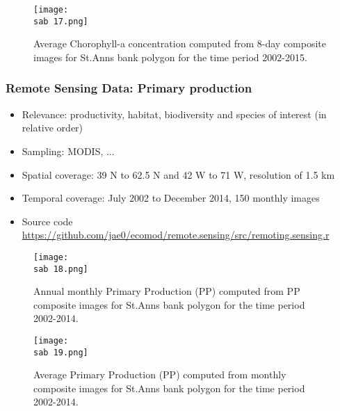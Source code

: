 \documentclass{beamer}
\numberwithin{equation}{section}		%
\numberwithin{figure}{section}		%
\numberwithin{table}{section}				%
\newcommand{\ecomod}{\string~/ecomod_data/}   %
\newcommand{\sab}{\ecomod/mpa/sab/}   %
\begin{document}

\begin{frame}[shrink]
  \begin{figure}[h]
    \centering
    \texttt{[image: \\sab 17.png]}
    \caption {Average Chorophyll-a concentration computed from 8-day composite images for St.Anns bank polygon for the time period 2002-2015. }
    \label{fig:ChlaSeasonal}
  \end{figure}
\end{frame}



\begin{frame}
  \frametitle{Remote Sensing Data: Primary production}
  \begin{itemize}
    \item Relevance:  productivity, habitat, biodiversity and species of interest (in relative order)
    \item Sampling:  MODIS, ...
    \item Spatial coverage: 39 N to 62.5 N and 42 W to 71 W, resolution of 1.5 km
    \item Temporal coverage: July 2002 to December 2014, 150 monthly  images
    \item Source code \url{https://github.com/jae0/ecomod/remote.sensing/src/remoting.sensing.r}
  \end{itemize}
\end{frame}



\begin{frame}[shrink]
  \begin{figure}[h]
    \centering
    \texttt{[image: \\sab 18.png]}
    \caption{Annual monthly Primary Production (PP) computed from PP composite images for St.Anns bank polygon for the time period 2002-2014.}
    \label{fig:ppTSmonthly}
  \end{figure}
\end{frame}



\begin{frame}[shrink]
  \begin{figure}[h]
    \centering
    \texttt{[image: \\sab 19.png]}
    \caption{Average Primary Production (PP) computed from monthly composite images for St.Anns bank polygon for the time period 2002-2014.}
    \label{fig:ppTSannual}
  \end{figure}
\end{frame}
\end{document}
